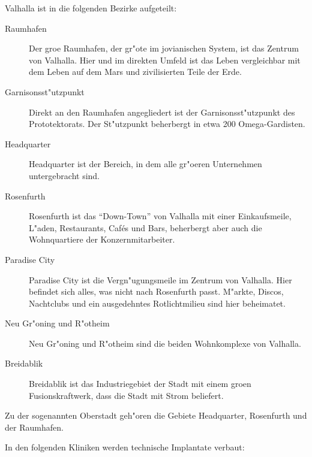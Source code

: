 
Valhalla ist in die folgenden Bezirke aufgeteilt:

\begin{description}
    \item[Raumhafen] Der gro\3e Raumhafen, der gr"o\3te im jovianischen System, ist das Zentrum von Valhalla. Hier und im direkten Umfeld 
        ist das Leben vergleichbar mit dem Leben auf dem Mars und zivilisierten Teile der Erde.
    \item [Garnisonsst"utzpunkt] Direkt an den Raumhafen angegliedert ist der Garnisonsst"utzpunkt des Prototektorats. Der St"utzpunkt 
        beherbergt in etwa 200 Omega-Gardisten. 
    \item [Headquarter] Headquarter ist der Bereich, in dem alle gr"o\3eren Unternehmen untergebracht sind.
    \item [Rosenfurth] Rosenfurth ist das ``Down-Town'' von Valhalla mit einer Einkaufsmeile, L"aden, Restaurants, Caf\'es und Bars, 
        beherbergt aber auch die Wohnquartiere der Konzernmitarbeiter.
    \item [Paradise City] Paradise City ist die Vergn"ugungsmeile im Zentrum von Valhalla. Hier befindet sich alles, was nicht nach 
        Rosenfurth passt. M"arkte, Discos, Nachtclubs und ein ausgedehntes Rotlichtmilieu sind hier beheimatet.
    \item [Neu Gr"oning und R"otheim] Neu Gr"oning und R"otheim sind die beiden Wohnkomplexe von Valhalla.
    \item [Breidablik] Breidablik ist das Industriegebiet der Stadt mit einem gro\3en Fusionskraftwerk, dass die Stadt mit Strom beliefert.
\end{description}

Zu der sogenannten Oberstadt geh"oren die Gebiete Headquarter, Rosenfurth und der Raumhafen.


In den folgenden Kliniken werden technische Implantate verbaut:

